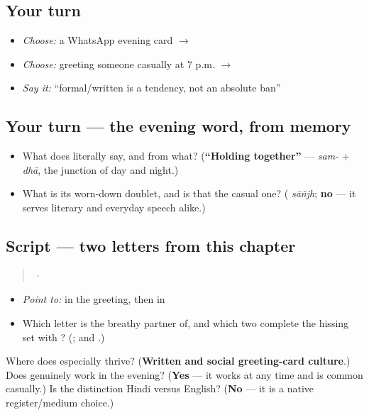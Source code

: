 \subsection*{Your turn}
\begin{itemize}
\raggedright
  \item \emph{Choose:} a WhatsApp evening card $\to$ \textbf{ }
  \item \emph{Choose:} greeting someone casually at 7 p.m. $\to$ \textbf{}
  \item \emph{Say it:} \textquotedblleft{}formal/written is a tendency, not an absolute ban\textquotedblright{}
\end{itemize}

\subsection*{Your turn — the evening word, from memory}
\begin{itemize}
\raggedright
  \item What does \textbf{} literally say, and from what? (\textbf{\textquotedblleft{}Holding together\textquotedblright{}} — \emph{sam-} + \emph{dhā}, the junction of day and night.)
  \item What is its worn-down doublet, and is that the casual one? (\textbf{} \emph{sāñjh}; \textbf{no} — it serves literary and everyday speech alike.)
\end{itemize}

\subsection*{Script — two letters from this chapter}
\begin{quote}
   ·  
\end{quote}

\begin{itemize}
\raggedright
  \item \emph{Point to:}  in the greeting, then  in 
  \item Which letter is \textbf{} the breathy partner of, and which two complete the hissing set with \textbf{}? (\textbf{}; \textbf{} and \textbf{}.)
\end{itemize}

\begin{tcolorbox}[breakable,colback=teal!4,colframe=teal!35!black,title={Before you move on}]
Where does \textbf{ } especially thrive? (\textbf{Written and social greeting-card culture}.) Does \textbf{} genuinely work in the evening? (\textbf{Yes} — it works at any time and is common casually.) Is the distinction Hindi versus English? (\textbf{No} — it is a native register/medium choice.)
\end{tcolorbox}
